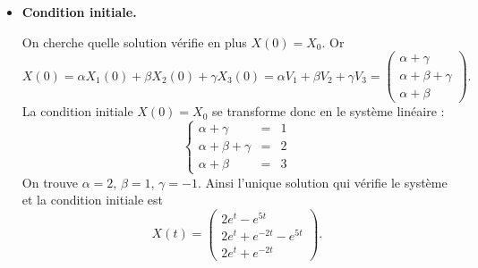 \documentclass[12pt, class=report,crop=false]{standalone}
\begin{document}
\begin{exemple}
\begin{itemize}
  \item \textbf{Condition initiale.}
  
  On cherche quelle solution vérifie en plus $X(0) = X_0$. Or
  $$X(0) = \alpha X_1(0) + \beta X_2(0) + \gamma X_3(0) 
  =  \alpha V_1 + \beta V_2 + \gamma V_3
  = \begin{pmatrix} \alpha + \gamma \\ \alpha+\beta +\gamma \\ \alpha + \beta \end{pmatrix}.$$
  La condition initiale $X(0) = X_0$ se transforme donc en le système linéaire :
  $$\left\{ \begin{array}{rcl}
  \alpha + \gamma &=& 1\\ 
  \alpha+\beta +\gamma &=& 2\\ 
  \alpha + \beta &=& 3
  \end{array}
  \right.$$
  On trouve $\alpha = 2$, $\beta = 1$, $\gamma = -1$.
  Ainsi l'unique solution qui vérifie le système et la condition initiale est
  $$X(t) = \begin{pmatrix} 2e^t - e^{5t} \\ 2e^t + e^{-2t} - e^{5t} \\ 2e^t+ e^{-2t} \end{pmatrix}.$$

\end{itemize}
\end{exemple}
\end{document}
